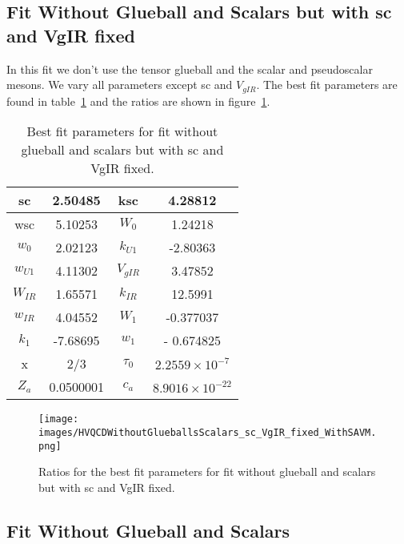 \documentclass[a4paper,12pt]{article}
\begin{document}
\subsection{Fit Without Glueball and Scalars but with sc and VgIR fixed}

In this fit we don't use the tensor glueball and the scalar and pseudoscalar mesons. We vary all parameters except sc and $V_{gIR}$. The best fit parameters are found in table~\ref{table: fit without glueball scalars sc VgIR fixed} and the ratios are shown in figure~\ref{figure: fit without glueball scalars sc VgIR fixed}.

\begin{table}
\centering
\begin{tabular}{ | c | c | c | c |}
\hline
sc & 2.50485 & ksc & 4.28812 \\
\hline
wsc & 5.10253 & $W_0$ & 1.24218 \\
\hline
$w_0$ & 2.02123 & $k_{U1}$ & -2.80363  \\
\hline
$w_{U1}$ & 4.11302 & $V_{gIR}$ & 3.47852 \\
\hline
$W_{IR}$ & 1.65571 & $k_{IR}$ & 12.5991 \\
\hline
$w_{IR}$ & 4.04552 & $W_1$ & -0.377037 \\
\hline
$k_1$ & -7.68695 & $w_1$ & - 0.674825 \\
\hline
x & 2/3 & $\tau_0$ & $2.2559 \times 10^{-7}$\\
\hline
$Z_a$ & 0.0500001 & $c_a$ & $8.9016 \times 10^{-22}$ \\
\hline
\end{tabular}
\caption{Best fit parameters for fit without glueball and scalars but with sc and VgIR fixed.}
\label{table: fit without glueball scalars sc VgIR fixed} 
\end{table}



\begin{figure}
  \center
  \texttt{[image: images/HVQCDWithoutGlueballsScalars\_sc\_VgIR\_fixed\_WithSAVM.png]} 
  \caption{Ratios for the best fit parameters for fit without glueball and scalars but with sc and VgIR fixed.}
   \label{figure: fit without glueball scalars sc VgIR fixed}
\end{figure}


\subsection{Fit Without Glueball and Scalars}
\end{document}
